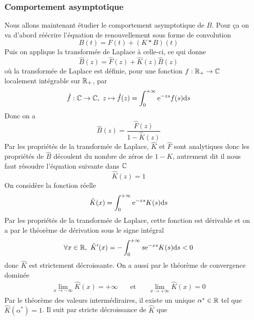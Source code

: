 \subsubsection{Comportement asymptotique}\label{sec_comportement_asymptotique_caracteristique}
Nous allons maintenant étudier le comportement asymptotique de $B$. Pour ça on va d'abord réécrire l'équation de renouvellement sous forme de convolution
\begin{equation*}
    B(t) = F(t) + (K*B)(t)
\end{equation*}
Puis on applique la transformée de Laplace à celle-ci, ce qui donne 
\begin{equation*}
    \hat{B}(z) = \hat{F}(z) + \hat{K}(z)\hat{B}(z)
\end{equation*}
où la transformée de Laplace est définie, pour une fonction $f : \mathbb{R}_+ \rightarrow \mathbb{C}$ localement intégrable sur $\mathbb{R}_+$, par 
\begin{equation*}
    \hat{f} : \mathbb{C} \rightarrow \mathbb{C}, \ z \mapsto \hat{f}(z)= \int_0^{+\infty} \mathrm{e}^{-zs}f(s)\mathrm{d} s
\end{equation*}
Donc on a 
\begin{equation*}
    \hat{B}(z) = \frac{\hat{F}(z)}{1-\hat{K}(z)}
\end{equation*}
Par les propriétés de la transformée de Laplace, $\hat{K}$ et $\hat{F}$ sont analytiques donc les propriétés de $\hat{B}$ découlent du nombre de zéros de $1-\hat{K}$, autrement dit il nous faut résoudre l'équation suivante dans $\mathbb{C}$
\begin{equation}\label{eq_K_Laplace}
    \hat{K}(z) = 1
\end{equation}
On considère la fonction réelle
\begin{equation*}
    \hat{K}(x) = \int_0^{+\infty} \mathrm{e}^{-xs}K(s)\mathrm{d} s
\end{equation*}
Par les propriétés de la transformée de Laplace, cette fonction est dérivable et on a par le théorème de dérivation sous le signe intégral
\begin{equation*}
    \forall x \in \mathbb{R}, \ \hat{K}'(x) = - \int_0^{+\infty}s\mathrm{e}^{-xs}K(s)\mathrm{d} s < 0
\end{equation*}
donc $\hat{K}$ est strictement décroissante. On a aussi par le théorème de convergence dominée
\begin{eqnarray*}
    \lim_{x \to -\infty} \hat{K}(x) = +\infty \ \ \ &\text{ et }& \ \ \ \lim_{x \to +\infty} \hat{K}(x) = 0
\end{eqnarray*}
Par le théorème des valeurs intermédiraires, il existe un unique $\alpha^* \in \mathbb{R}$ tel que $\hat{K}(\alpha^*) = 1$. Il suit par stricte décroissance de $\hat{K}$ que 
